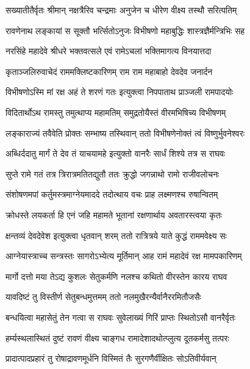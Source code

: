\twolineshloka
{सख्यातीतैर्वृतः श्रीमान् नक्षत्रैरिव चन्द्रमाः}
{अनुजेन च धीरेण वीक्ष्य तस्थौ सरित्पतिम्} %

\twolineshloka
{रावणेनाथ लङ्कायां स सूक्तौ भर्त्सितोऽनुजः}
{विभीषणो महाबुद्धिः शास्त्रज्ञैर्मन्त्रिभिः सह} %

\twolineshloka
{नरसिंहे महादेवे श्रीधरे भक्तवत्सले}
{एवं रामेऽचलां भक्तिमागत्य विनयात्तदा} %

\twolineshloka
{कृताञ्जलिरुवाचेदं राममक्लिष्टकारिणम्}
{राम राम महाबाहो देवदेव जनार्दन} %

\twolineshloka
{विभीषणोऽस्मि मां रक्ष अहं ते शरणं गतः}
{इत्युक्त्वा निपपाताथ प्राञ्जली रामपादयोः} %

\twolineshloka
{विदितार्थोऽथ रामस्तु तमुत्थाप्य महामतिम्}
{समुद्रतोयैस्तं वीरमभिषिच्य विभीषणम्} %

\twolineshloka
{लङ्काराज्यं तवैवेति प्रोक्तः सम्भाष्य तस्थिवान्}
{ततो विभीषणेनोक्तं त्वं विष्णुर्भुवनेश्वरः} %

\twolineshloka
{अब्धिर्ददातु मार्गं ते देव तं याचयामहे}
{इत्युक्तो वानरैः सार्धं शिश्ये तत्र स राघवः} %

\twolineshloka
{सुप्ते रामे गतं तत्र त्रिरात्रमतितद्युतौ}
{ततः क्रुद्धो जगन्नाथो रामो राजीवलोचनः} %

\twolineshloka
{संशोषणमपां कर्तुमस्त्रमाग्नेयमाददे}
{तदोत्थाय वचः प्राह लक्ष्मणश्च रुषान्वितम्} %

\twolineshloka
{क्रोधस्ते लयकर्ता हि एनं जहि महामते}
{भूतानां रक्षणार्थाय अवतारस्त्वया कृतः} %

\twolineshloka
{क्षन्तव्यं देवदेवेश इत्युक्त्वा धृतवान् शरम्}
{ततो रात्रित्रये याते कुद्धं राममवेक्ष्य सः} %

\twolineshloka
{आग्नेयास्त्राच्च सन्त्रस्तः सागरोऽभ्येत्य मूर्तिमान्}
{आह रामं महादेवं रक्ष मामपकारिणम्} %

\twolineshloka
{मार्गो दत्तो मया तेऽद्य कुशलः सेतुकर्मणि}
{नलश्च कथितो वीरस्तेन कारय राघव} %

\twolineshloka
{यावदिष्टं तु विस्तीर्ण सेतुबन्धमुत्तमम्}
{ततो नलमुखैरन्यैर्वानैररमितौजसैः} %

\twolineshloka
{बन्धयित्वा महासेतुं तेन गत्वा स राघवः}
{सुवेलाख्यं गिरिं प्राप्तः स्थितोऽसौ वानरैर्वृतः} %

\twolineshloka
{हर्म्यस्थलास्थितं दुष्टं रावणं वीक्ष्य चाङ्गध}
{रामादेशादथोत्प्लुत्य दूतकर्मसु तत्परः} %

\twolineshloka
{प्रादात्पादप्रहारं तु रोषाद्रावणमूर्धनि}
{विस्मितं तैः सुरगणैर्वीक्षितः सोऽतिवीर्यवान्} %

